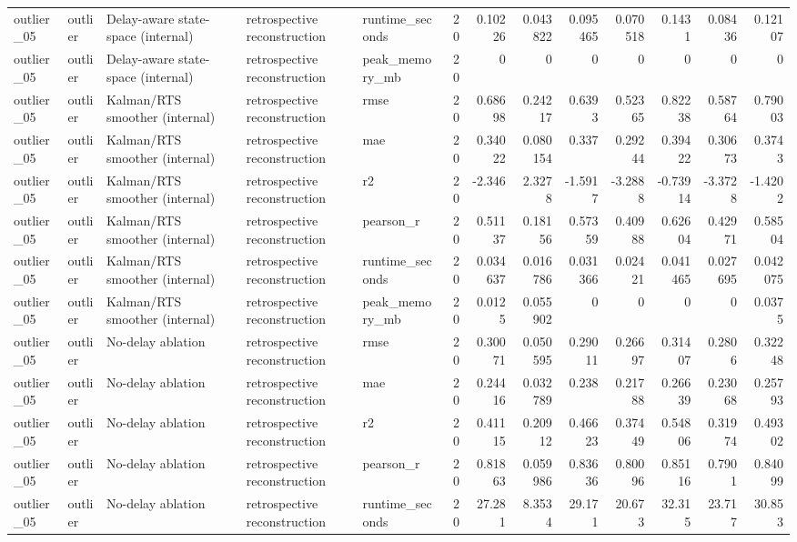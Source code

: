 \begin{table}[!htbp]
{{\begin{tabular}{lllllrrrrrrrr}
outlier_05 & outlier & Delay-aware state-space (internal) & retrospective reconstruction & runtime_seconds & 20 & 0.10226 & 0.043822 & 0.095465 & 0.070518 & 0.1431 & 0.08436 & 0.12107 \\
outlier_05 & outlier & Delay-aware state-space (internal) & retrospective reconstruction & peak_memory_mb & 20 & 0 & 0 & 0 & 0 & 0 & 0 & 0 \\
outlier_05 & outlier & Kalman/RTS smoother (internal) & retrospective reconstruction & rmse & 20 & 0.68698 & 0.24217 & 0.6393 & 0.52365 & 0.82238 & 0.58764 & 0.79003 \\
outlier_05 & outlier & Kalman/RTS smoother (internal) & retrospective reconstruction & mae & 20 & 0.34022 & 0.080154 & 0.337 & 0.29244 & 0.39422 & 0.30673 & 0.3743 \\
outlier_05 & outlier & Kalman/RTS smoother (internal) & retrospective reconstruction & r2 & 20 & -2.346 & 2.3278 & -1.5917 & -3.2888 & -0.73914 & -3.3728 & -1.4202 \\
outlier_05 & outlier & Kalman/RTS smoother (internal) & retrospective reconstruction & pearson_r & 20 & 0.51137 & 0.18156 & 0.57359 & 0.40988 & 0.62604 & 0.42971 & 0.58504 \\
outlier_05 & outlier & Kalman/RTS smoother (internal) & retrospective reconstruction & runtime_seconds & 20 & 0.034637 & 0.016786 & 0.031366 & 0.02421 & 0.041465 & 0.027695 & 0.042075 \\
outlier_05 & outlier & Kalman/RTS smoother (internal) & retrospective reconstruction & peak_memory_mb & 20 & 0.0125 & 0.055902 & 0 & 0 & 0 & 0 & 0.0375 \\
outlier_05 & outlier & No-delay ablation & retrospective reconstruction & rmse & 20 & 0.30071 & 0.050595 & 0.29011 & 0.26697 & 0.31407 & 0.2806 & 0.32248 \\
outlier_05 & outlier & No-delay ablation & retrospective reconstruction & mae & 20 & 0.24416 & 0.032789 & 0.238 & 0.21788 & 0.26639 & 0.23068 & 0.25793 \\
outlier_05 & outlier & No-delay ablation & retrospective reconstruction & r2 & 20 & 0.41115 & 0.20912 & 0.46623 & 0.37449 & 0.54806 & 0.31974 & 0.49302 \\
outlier_05 & outlier & No-delay ablation & retrospective reconstruction & pearson_r & 20 & 0.81863 & 0.059986 & 0.83636 & 0.80096 & 0.85116 & 0.7901 & 0.84099 \\
outlier_05 & outlier & No-delay ablation & retrospective reconstruction & runtime_seconds & 20 & 27.281 & 8.3534 & 29.171 & 20.673 & 32.315 & 23.717 & 30.853 \\

\end{tabular}}}
\end{table}
